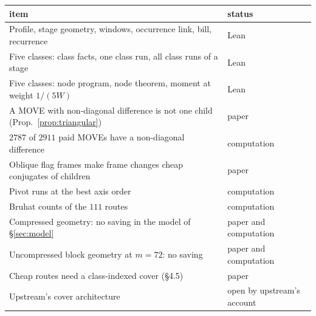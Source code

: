 \documentclass[11pt]{amsart}
\begin{document}
\begin{center}
\small
\begin{tabularx}{\textwidth}{@{}Xl@{}}
\toprule
item & status\\
\midrule
Profile, stage geometry, windows, occurrence link, bill, recurrence & Lean\\
Five classes: class facts, one class run, all class runs of a stage & Lean\\
Five classes: node program, node theorem, moment at weight $1/(5W)$ & Lean\\
A MOVE with non-diagonal difference is not one child (Prop.~\ref{prop:triangular}) & paper\\
$2787$ of $2911$ paid MOVEs have a non-diagonal difference & computation\\
Oblique flag frames make frame changes cheap conjugates of children & paper\\
Pivot runs at the best axis order & computation\\
Bruhat counts of the $111$ routes & computation\\
Compressed geometry: no saving in the model of \S\ref{sec:model} & paper and computation\\
Uncompressed block geometry at $m = 72$: no saving & paper and computation\\
Cheap routes need a class-indexed cover (\S4.5) & paper\\
Upstream's cover architecture & open by upstream's account\\
\bottomrule
\end{tabularx}
\end{center}
\end{document}
